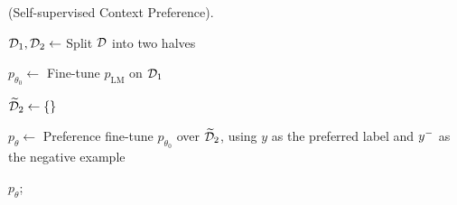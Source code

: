 








\begin{algorithm}[ht]
\small
\caption{\scope (Self-supervised Context Preference).}
\label{alg:method}
\BlankLine
{}
$\mathcal{D}_1, \mathcal{D}_2 \leftarrow$ Split $\mathcal{D}$ into two halves

\BlankLine
{}
$p_{\theta_0} \leftarrow$ Fine-tune $p_\mathrm{LM}$ on $\mathcal{D}_1$

\BlankLine
{}
$\widetilde{\mathcal{D}}_2 \leftarrow \{\}$
\BlankLine
{}


\BlankLine
{}

$p_\theta  \leftarrow$ Preference fine-tune $p_{\theta_0}$ over $\widetilde{\mathcal{D}}_2$, using $y$ as the preferred label and $y^-$ as the negative example

\BlankLine
\Return $p_\theta$;
\end{algorithm}
